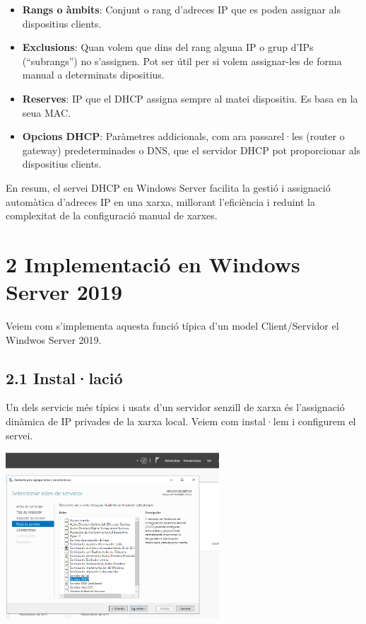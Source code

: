 \documentclass[
  a4paper,
]{article}
\begin{document}
\begin{itemize}
\item
  \textbf{Rangs o àmbits}: Conjunt o rang d'adreces IP que es poden
  assignar als dispositius clients.
\item
  \textbf{Exclusions}: Quan volem que dins del rang alguna IP o grup
  d'IPs (``subrangs'') no s'assignen. Pot ser útil per si volem
  assignar-les de forma manual a determinats dipositius.
\item
  \textbf{Reserves}: IP que el DHCP assigna sempre al matei dispositiu.
  Es basa en la seua MAC.
\item
  \textbf{Opcions DHCP}: Paràmetres addicionals, com ara passarel·les
  (router o gateway) predeterminades o DNS, que el servidor DHCP pot
  proporcionar als dispositius clients.
\end{itemize}

En resum, el servei DHCP en Windows Server facilita la gestió i
assignació automàtica d'adreces IP en una xarxa, millorant l'eficiència
i reduint la complexitat de la configuració manual de xarxes.

\section{2 Implementació en Windows Server
2019}\label{implementaciuxf3-en-windows-server-2019}

Veiem com s'implementa aquesta funció típica d'un model Client/Servidor
el Windwos Server 2019.

\subsection{2.1 Instal·lació}\label{installaciuxf3}

Un dels servicis més típics i usats d'un servidor senzill de xarxa és
l'assignació dinàmica de IP privades de la xarxa local. Veiem com
instal·lem i configurem el servei.

\includegraphics[width=0.6\textwidth,height=\textheight]{png/DHCP1.png}
\end{document}

